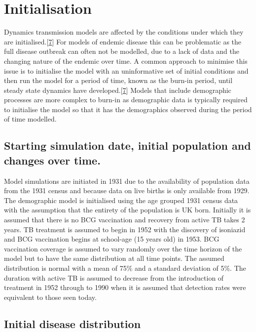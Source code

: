 \documentclass[11pt,twoside]{bristolthesis}
\begin{document}
  \hypertarget{initialisation}{%
  \section{Initialisation}\label{initialisation}}
  
  Dynamics transmission models are affected by the conditions under which they are initialised.{[}\protect\hyperlink{ref-Anderson1991}{7}{]} For models of endemic disease this can be problematic as the full disease outbreak can often not be modelled, due to a lack of data and the changing nature of the endemic over time. A common approach to minimise this issue is to initialise the model with an uninformative set of initial conditions and then run the model for a period of time, known as the burn-in period, until steady state dynamics have developed.{[}\protect\hyperlink{ref-Anderson1991}{7}{]} Models that include demographic processes are more complex to burn-in as demographic data is typically required to initialise the model so that it has the demographics observed during the period of time modelled.
  
  \hypertarget{starting-simulation-date-initial-population-and-changes-over-time.}{%
  \subsection{Starting simulation date, initial population and changes over time.}\label{starting-simulation-date-initial-population-and-changes-over-time.}}
  
  Model simulations are initiated in 1931 due to the availability of population data from the 1931 census and because data on live births is only available from 1929. The demographic model is initialised using the age grouped 1931 census data with the assumption that the entirety of the population is UK born. Initially it is assumed that there is no BCG vaccination and recovery from active TB takes 2 years. TB treatment is assumed to begin in 1952 with the discovery of isoniazid and BCG vaccination begins at school-age (15 years old) in 1953. BCG vaccination coverage is assumed to vary randomly over the time horizon of the model but to have the same distribution at all time points. The assumed distribution is normal with a mean of 75\% and a standard deviation of 5\%. The duration with active TB is assumed to decrease from the introduction of treatment in 1952 through to 1990 when it is assumed that detection rates were equivalent to those seen today.
  
  \hypertarget{initial-disease-distribution}{%
  \subsection{Initial disease distribution}\label{initial-disease-distribution}}
  
\end{document}
